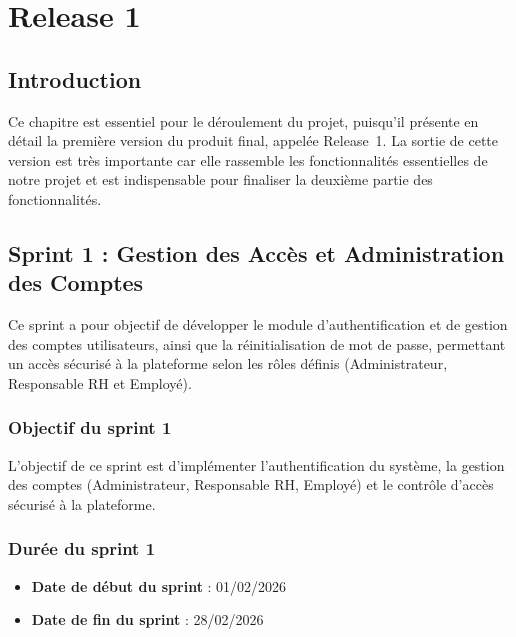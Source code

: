 \chapter{Release 1}





\newpage

\section{Introduction}

Ce chapitre est essentiel pour le déroulement du projet, puisqu'il présente en détail la première version du produit final, appelée Release~1. La sortie de cette version est très importante car elle rassemble les fonctionnalités essentielles de notre projet et est indispensable pour finaliser la deuxième partie des fonctionnalités.

\section{Sprint 1 : Gestion des Accès et Administration des Comptes}

Ce sprint a pour objectif de développer le module d'authentification et de gestion des comptes utilisateurs, ainsi que la réinitialisation de mot de passe, permettant un accès sécurisé à la plateforme selon les rôles définis (Administrateur, Responsable RH et Employé).

\subsection{Objectif du sprint 1}

L'objectif de ce sprint est d'implémenter l'authentification du système, la gestion des comptes (Administrateur, Responsable RH, Employé) et le contrôle d'accès sécurisé à la plateforme.

\subsection{Durée du sprint 1}

\begin{itemize}
    \item \textbf{Date de début du sprint} : 01/02/2026
    \item \textbf{Date de fin du sprint} : 28/02/2026
\end{itemize}

